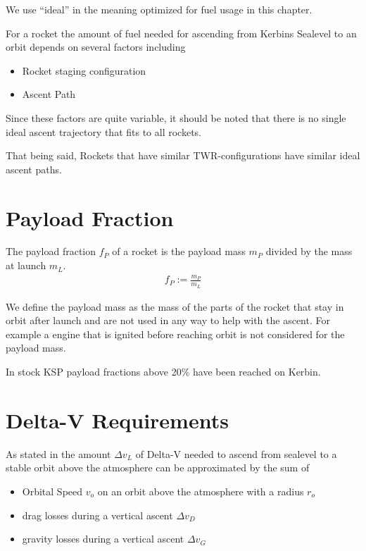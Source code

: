 \documentclass[11pt]{report}
\newcommand{\dv}{{\Delta}{v}}
\begin{document}
We use ``ideal'' in the meaning optimized for fuel usage in this
chapter.

For a rocket the amount of fuel needed for ascending from Kerbins
Sealevel to an orbit depends on several factors including

\begin{itemize}
\item Rocket staging configuration
\item Ascent Path
\end{itemize}

Since these factors are quite variable, it should be noted that there
is no single ideal ascent trajectory that fits to all rockets.

That being said, Rockets that have similar TWR-configurations have
similar ideal ascent paths.

\section{Payload Fraction}

The payload fraction $f_P$ of a rocket is the payload mass $m_P$ divided by
the mass at launch $m_L$.
\begin{align}
  f_P := \frac{m_P}{m_L}
\end{align}

We define the payload mass as the mass of the parts of the rocket that
stay in orbit after launch and are not used in any way to help with
the ascent. For example a engine that is ignited before reaching orbit
is not considered for the payload mass.

In stock KSP payload fractions above 20\% have been reached on
Kerbin. \cite{PayloadFractionChallenge}

\section{Delta-V Requirements}

As stated in \cite{AscentDeltaVApproximation} the amount $\dv_L$ of
Delta-V needed to ascend from sealevel to a stable orbit above the
atmosphere can be approximated by the sum of
\begin{itemize}
\item Orbital Speed $v_o$ on an orbit above the atmosphere with a
  radius $r_o$
\item drag losses during a vertical ascent $\dv_D$
\item gravity losses during a vertical ascent $\dv_G$
\end{itemize}
\end{document}
